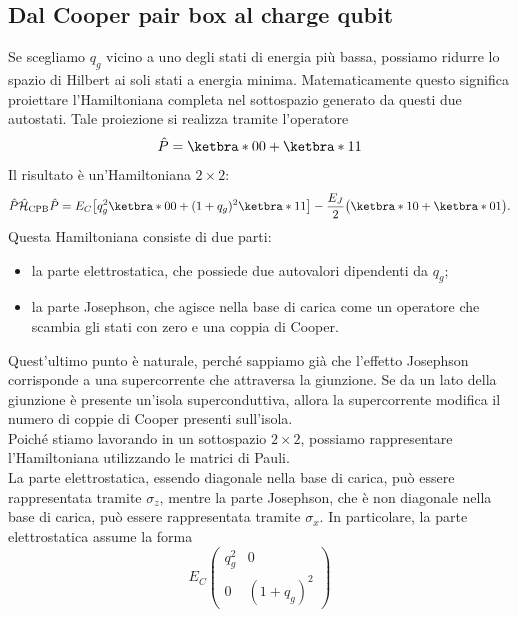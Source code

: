 \subsection{Dal Cooper pair box al charge qubit}
Se scegliamo $q_g$ vicino a uno degli stati di energia più bassa, possiamo ridurre lo spazio di Hilbert ai soli stati a energia minima. Matematicamente questo significa proiettare l'Hamiltoniana completa nel sottospazio generato da questi due autostati. Tale proiezione si realizza tramite l'operatore
\begin{equation*}
    \hat{P}
    =
    \ketbra*{0}{0}
    +
    \ketbra*{1}{1}
\end{equation*}
Il risultato è un'Hamiltoniana $2 \times 2$:
\begin{equation*}
    \hat{P}\hat{\mathcal{H}}_{\text{CPB}}\hat{P}
    =
    E_C
    \bigl[
        q_g^2 \ketbra*{0}{0}
        +
        (1+q_g)^2 \ketbra*{1}{1}
    \bigr]
    -
    \frac{E_J}{2}
    \bigl(
        \ketbra*{1}{0}
        +
        \ketbra*{0}{1}
    \bigr).
\end{equation*}
Questa Hamiltoniana consiste di due parti:
\begin{itemize}[leftmargin=0.5cm]
    \item la parte elettrostatica, che possiede due autovalori dipendenti da $q_g$;
    \item la parte Josephson, che agisce nella base di carica come un operatore che scambia gli stati con zero e una coppia di Cooper.
\end{itemize}
Quest'ultimo punto è naturale, perché sappiamo già che l'effetto Josephson corrisponde a una supercorrente che attraversa la giunzione. Se da un lato della giunzione è presente un'isola superconduttiva, allora la supercorrente modifica il numero di coppie di Cooper presenti sull'isola.\\
Poiché stiamo lavorando in un sottospazio $2 \times 2$, possiamo rappresentare l'Hamiltoniana utilizzando le matrici di Pauli.\\
La parte elettrostatica, essendo diagonale nella base di carica, può essere rappresentata tramite $\sigma_z$, mentre la parte Josephson, che è non diagonale nella base di carica, può essere rappresentata tramite $\sigma_x$. In particolare, la parte elettrostatica assume la forma
\begin{equation*}
    E_C
    \begin{pmatrix}
        q_g^2 & 0 \\
        0 & (1+q_g)^2
    \end{pmatrix}
\end{equation*}
